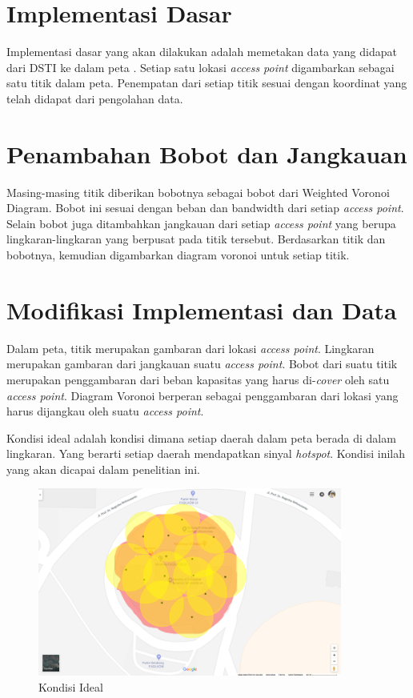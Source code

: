 \section{Implementasi Dasar}
Implementasi dasar yang akan dilakukan adalah memetakan data yang didapat dari DSTI ke dalam peta {\ui}. Setiap satu lokasi \textit{access point} digambarkan sebagai satu titik dalam peta. Penempatan dari setiap titik sesuai dengan koordinat yang telah didapat dari pengolahan data.

\section{Penambahan Bobot dan Jangkauan}
Masing-masing titik diberikan bobotnya sebagai bobot dari Weighted Voronoi Diagram. Bobot ini sesuai dengan beban dan bandwidth dari setiap \textit{access point}. Selain bobot juga ditambahkan jangkauan dari setiap \textit{access point} yang berupa lingkaran-lingkaran yang berpusat pada titik tersebut. Berdasarkan titik dan bobotnya, kemudian digambarkan diagram voronoi untuk setiap titik.

\section{Modifikasi Implementasi dan Data}
Dalam peta, titik merupakan gambaran dari lokasi \textit{access point}. Lingkaran merupakan gambaran dari jangkauan suatu \textit{access point}. Bobot dari suatu titik merupakan penggambaran dari beban kapasitas yang harus di-\textit{cover} oleh satu \textit{access point}. Diagram Voronoi berperan sebagai penggambaran dari lokasi yang harus dijangkau oleh suatu \textit{access point}. 

Kondisi ideal adalah kondisi dimana setiap daerah dalam peta berada di dalam lingkaran. Yang berarti setiap daerah mendapatkan sinyal \textit{hotspot}. Kondisi inilah yang akan dicapai dalam penelitian ini. 

\begin{figure}
	\centering
	\includegraphics[width=10cm]{pics/fasilkom-demand-coverage.png}
	\caption{Kondisi Ideal}
	\label{fig:kondisiIdeal}
\end{figure}

